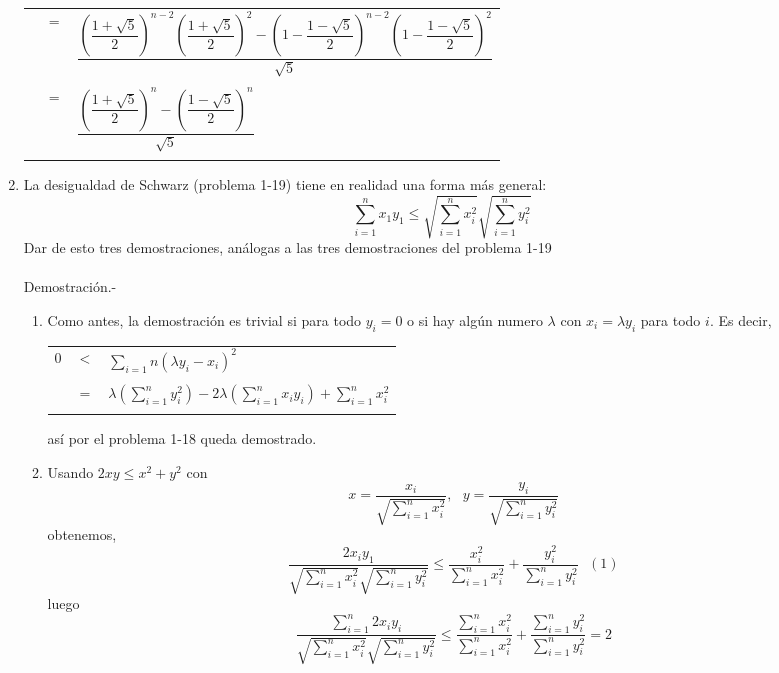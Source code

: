 \begin{enumerate}
\begin{center}
\begin{tabular}{rcl}
		  & $=$ & $\dfrac{\left( \dfrac{1+\sqrt{5}}{2} \right)^{n-2} \left( \dfrac{1+\sqrt{5}}{2}\right)^2 - \left( 1 - \dfrac{1-\sqrt{5}}{2} \right)^{n-2} \left( 1 - \dfrac{1-\sqrt{5}}{2} \right)^2}{\sqrt{5}}$\\\\
	       & $=$ & $\dfrac{\left( \dfrac{1+\sqrt{5}}{2} \right)^n - \left( \dfrac{1-\sqrt{5}}{2} \right)^n}{\sqrt{5}}$\\\\
	 \end{tabular}
      \end{center}

   \item La desigualdad de Schwarz (problema 1-19) tiene en realidad una forma más general: $$\displaystyle\sum_{i=1}^n x_1 y_1 \leq \sqrt{\sum_{i=1}^n x_i^2} \sqrt{\sum_{i=1}^n y_i^2}$$
      Dar de esto tres demostraciones, análogas a las tres demostraciones del problema 1-19\\\\
      Demostración.-\; 
      \begin{enumerate}[\bfseries i)]
	 \item Como antes, la demostración es trivial si para todo $y_i=0$ o si hay algún numero $\lambda$ con $x_i=\lambda y_i$ para todo $i$. Es decir, 
	    \begin{center} 
	       \begin{tabular}{rcl}
		  $0$ & $<$ & $\sum\limits_{i=1}n (\lambda y_i - x_i)^2$\\\\
		   & $=$ & $\lambda \left( \sum\limits_{i=1}^n y_i^2 \right) -2 \lambda \left( \sum\limits_{i=1}^n x_i y_i\right) + \sum\limits_{i=1}^n x_i^2$\\\\
	       \end{tabular}
	       así por el problema 1-18 queda demostrado. 
	    \end{center}
	 \item Usando $2xy \leq x^2 + y^2$ con 
            $$x=\dfrac{x_i}{\sqrt{\sum\limits_{i=1}^n x_i^2}}, \,\,\,\, y=\dfrac{y_i}{\sqrt{\sum\limits_{i=1}^n y_i^2}}$$
            obtenemos, 
            $$\dfrac{2x_iy_1}{\sqrt{\sum\limits_{i=1}^n x_i^2} \sqrt{\sum\limits_{i=1}^n y_i^2}} \leq \dfrac{x_i^2}{\sum\limits_{i=1}^n x_i^2} + \dfrac{y_i^2}{\sum\limits_{i=1}^n y_i^2} \,\,\,\, (1)$$
            luego
            $$\dfrac{\sum\limits_{i=1}^n 2x_iy_i}{\sqrt{\sum\limits_{i=1}^n x_i^2} \sqrt{\sum\limits_{i=1}^n y_i^2}} \leq \dfrac{\sum\limits_{i=1}^n x_i^2}{\sum\limits_{i=1}^n x_i^2} + \dfrac{\sum\limits_{i=1}^n y_i^2}{\sum\limits_{i=1}^n y_i^2}=2$$

\end{enumerate}
\end{enumerate}
